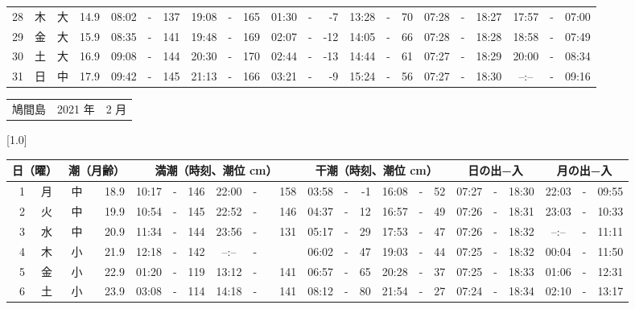 \documentclass[12pt,a4j]{jsarticle}
\begin{document}
\begin{table}[htbp]
\begin{center}
{\begin{tabular}{|rc|cr|ccrccr|ccrccr|ccc|ccc|}
28 & 木 & 大 & 14.9 &  08:02 &-& 137 &  19:08 &-& 165 &  01:30 &-&  -7 &  13:28 &-&  70 & 07:28 & -& 18:27 & 17:57 & -& 07:00 \\
29 & 金 & 大 & 15.9 &  08:35 &-& 141 &  19:48 &-& 169 &  02:07 &-& -12 &  14:05 &-&  66 & 07:28 & -& 18:28 & 18:58 & -& 07:49 \\
30 & 土 & 大 & 16.9 &  09:08 &-& 144 &  20:30 &-& 170 &  02:44 &-& -13 &  14:44 &-&  61 & 07:27 & -& 18:29 & 20:00 & -& 08:34 \\
31 & 日 & 中 & 17.9 &  09:42 &-& 145 &  21:13 &-& 166 &  03:21 &-&  -9 &  15:24 &-&  56 & 07:27 & -& 18:30 & --:-- & -& 09:16 \\
   \hline
   \end{tabular}}
   \end{center}
\end{table}
\newpage
 \begin{table}[htbp]
 \begin{center}
 \begin{tabular}{lcc}
 \LARGE{鳩間島}  & \large{2021 年} & \large{ 2 月} \\
 \end{tabular}
 \end{center}
 \begin{center}
    \scalebox{0.7}[1.0]{
    \begin{tabular}{|rc|cr|ccrccr|ccrccr|ccc|ccc|}
    \hline
    \multicolumn{2}{|c|}{日（曜）} & \multicolumn{2}{c|}{潮（月齢）} & \multicolumn{6}{c|}{満潮（時刻、潮位 cm）} & \multicolumn{6}{c|}{干潮（時刻、潮位 cm）} & \multicolumn{3}{c|}{日の出−入} &  \multicolumn{3}{c|}{月の出−入}\\
 \hline
 1 & 月 & 中 & 18.9 &  10:17 &-& 146 &  22:00 &-& 158 &  03:58 &-&  -1 &  16:08 &-&  52 & 07:27 & -& 18:30 & 22:03 & -& 09:55 \\
 2 & 火 & 中 & 19.9 &  10:54 &-& 145 &  22:52 &-& 146 &  04:37 &-&  12 &  16:57 &-&  49 & 07:26 & -& 18:31 & 23:03 & -& 10:33 \\
 3 & 水 & 中 & 20.9 &  11:34 &-& 144 &  23:56 &-& 131 &  05:17 &-&  29 &  17:53 &-&  47 & 07:26 & -& 18:32 & --:-- & -& 11:11 \\
 4 & 木 & 小 & 21.9 &  12:18 &-& 142 &  --:-- &-&~~~~~ &  06:02 &-&  47 &  19:03 &-&  44 & 07:25 & -& 18:32 & 00:04 & -& 11:50 \\
 5 & 金 & 小 & 22.9 &  01:20 &-& 119 &  13:12 &-& 141 &  06:57 &-&  65 &  20:28 &-&  37 & 07:25 & -& 18:33 & 01:06 & -& 12:31 \\
 6 & 土 & 小 & 23.9 &  03:08 &-& 114 &  14:18 &-& 141 &  08:12 &-&  80 &  21:54 &-&  27 & 07:24 & -& 18:34 & 02:10 & -& 13:17 \\

\end{tabular}}
\end{center}
\end{table}
\end{document}
